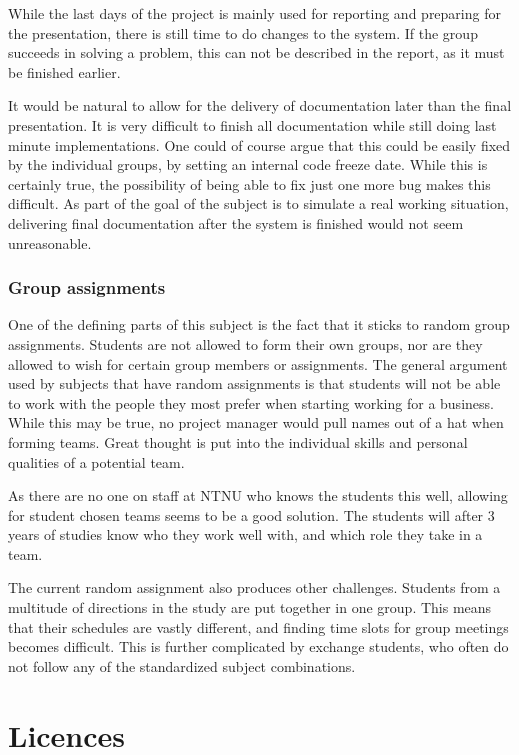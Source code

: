 \documentclass[11pt,a4paper,titlepage,oneside]{report}
\begin{document}
While the last days of the project is mainly used for reporting and preparing for the presentation, there is still time to do changes to the system. If the group succeeds in solving a problem, this can not be described in the report, as it must be finished earlier. 

It would be natural to allow for the delivery of documentation later than the final presentation. It is very difficult to finish all documentation while still doing last minute implementations. One could of course argue that this could be easily fixed by the individual groups, by setting an internal code freeze date. While this is certainly true, the possibility of being able to fix just one more bug makes this difficult. As part of the goal of the subject is to simulate a real working situation, delivering final documentation after the system is finished would not seem unreasonable. 

\subsection{Group assignments}
One of the defining parts of this subject is the fact that it sticks to random group assignments. Students are not allowed to form their own groups, nor are they allowed to wish for certain group members or assignments. The general argument used by subjects that have random assignments is that students will not be able to work with the people they most prefer when starting working for a business. While this may be true, no project manager would pull names out of a hat when forming teams. Great thought is put into the individual skills and personal qualities of a potential team.

As there are no one on staff at \gls{NTNU} who knows the students this well, allowing for student chosen teams seems to be a good solution. The students will after 3 years of studies know who they work well with, and which role they take in a team. 

The current random assignment also produces other challenges. Students from a multitude of directions in the study are put together in one group. This means that their schedules are vastly different, and finding time slots for group meetings becomes difficult. This is further complicated by exchange students, who often do not follow any of the standardized subject combinations. 

\chapter{Licences} 
\end{document}
